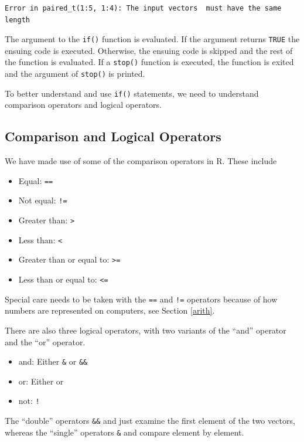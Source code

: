 \documentclass[]{krantz}
\providecommand{\tightlist}{%
  \setlength{\itemsep}{0pt}\setlength{\parskip}{0pt}}
\begin{document}
\begin{verbatim}
Error in paired_t(1:5, 1:4): The input vectors  must have the same length
\end{verbatim}

The argument to the \texttt{if()} function is evaluated. If the argument
returns \texttt{TRUE} the ensuing code is executed. Otherwise, the
ensuing code is skipped and the rest of the function is evaluated. If a
\texttt{stop()} function is executed, the function is exited and the
argument of \texttt{stop()} is printed.

To better understand and use \texttt{if()} statements, we need to
understand comparison operators and logical operators.

\subsection{Comparison and Logical
Operators}\label{comparison-and-logical-operators}

We have made use of some of the comparison operators in R. These include

\begin{itemize}
\tightlist
\item
  Equal: \texttt{==}
\item
  Not equal: \texttt{!=}
\item
  Greater than: \texttt{\textgreater{}}
\item
  Less than: \texttt{\textless{}}
\item
  Greater than or equal to: \texttt{\textgreater{}=}
\item
  Less than or equal to: \texttt{\textless{}=}
\end{itemize}

Special care needs to be taken with the \texttt{==} and \texttt{!=}
operators because of how numbers are represented on computers, see
Section \ref{arith}.

There are also three logical operators, with two variants of the ``and''
operator and the ``or'' operator.

\begin{itemize}
\tightlist
\item
  and: Either \texttt{\&} or \texttt{\&\&}
\item
  or: Either \texttt{\textbar{}} or \texttt{\textbar{}\textbar{}}
\item
  not: \texttt{!}
\end{itemize}

The ``double'' operators \texttt{\&\&} and \texttt{\textbar{}\textbar{}}
just examine the first element of the two vectors, whereas the
``single'' operators \texttt{\&} and \texttt{\textbar{}} compare element
by element.
\end{document}
